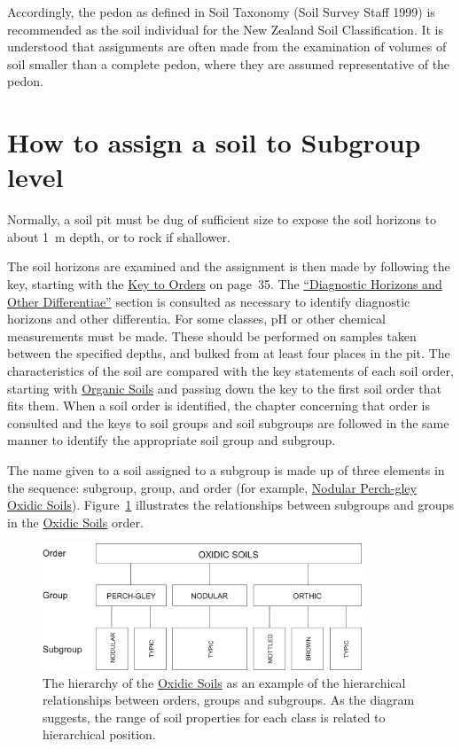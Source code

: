 \documentclass[
  letterpaper,
  DIV=11,
  numbers=noendperiod]{scrreprt}
\begin{document}
Accordingly, the pedon as defined in Soil Taxonomy (Soil Survey Staff
1999) is recommended as the soil individual for the New Zealand Soil
Classification. It is understood that assignments are often made from
the examination of volumes of soil smaller than a complete pedon, where
they are assumed representative of the pedon.

\hypertarget{sec-intro-assign-subgroup}{%
\section{How to assign a soil to Subgroup
level}\label{sec-intro-assign-subgroup}}

Normally, a soil pit must be dug of sufficient size to expose the soil
horizons to about 1~m depth, or to rock if shallower.

The soil horizons are examined and the assignment is then made by
following the key, starting with the \protect\hyperlink{sec-key}{Key to
Orders} on page~35. The \protect\hyperlink{sec-diagnostics}{``Diagnostic
Horizons and Other Differentiae''} section is consulted as necessary to
identify diagnostic horizons and other differentia. For some classes, pH
or other chemical measurements must be made. These should be performed
on samples taken between the specified depths, and bulked from at least
four places in the pit. The characteristics of the soil are compared
with the key statements of each soil order, starting with
\protect\hyperlink{sec-O}{Organic Soils} and passing down the key to the
first soil order that fits them. When a soil order is identified, the
chapter concerning that order is consulted and the keys to soil groups
and soil subgroups are followed in the same manner to identify the
appropriate soil group and subgroup.

The name given to a soil assigned to a subgroup is made up of three
elements in the sequence: subgroup, group, and order (for example,
\protect\hyperlink{sec-key-XPN}{Nodular Perch-gley Oxidic Soils}).
Figure~\ref{fig-1} illustrates the relationships between subgroups and
groups in the \protect\hyperlink{sec-ord-X}{Oxidic Soils} order.

\begin{figure}

{\centering \includegraphics[width=0.85\textwidth,height=\textheight]{./images/Figure-001_oxidic-soils-hierarchy.png}

}

\caption{\label{fig-1}The hierarchy of the
\protect\hyperlink{ord-X}{Oxidic Soils} as an example of the
hierarchical relationships between orders, groups and subgroups. As the
diagram suggests, the range of soil properties for each class is related
to hierarchical position.}

\end{figure}
\end{document}
